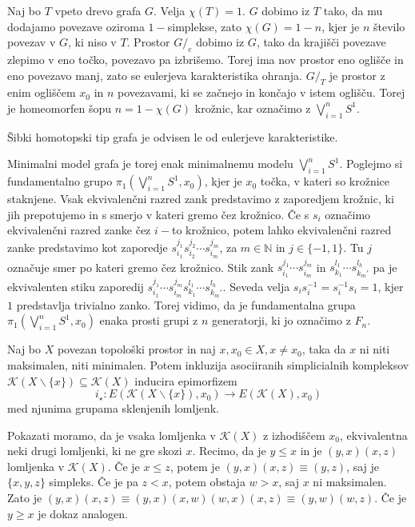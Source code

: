 \documentclass[mat1]{fmfdelo}
\newcommand{\N}{\mathbb N}
\begin{document}
Naj bo $T$ vpeto drevo grafa $G$. Velja $\chi(T)=1$. $G$ dobimo iz $T$ tako, da mu dodajamo povezave 
oziroma $1-$simplekse, zato $\chi(G)=1-n$, kjer je $n$ število povezav v $G$, ki niso v 
$T$. Prostor $G/_e$ dobimo iz $G$, tako da krajišči povezave zlepimo v eno točko, povezavo pa 
izbrišemo. Torej ima nov prostor eno oglišče in eno povezavo manj, zato se eulerjeva karakteristika 
ohranja. $G/_T$ je prostor z enim ogliščem $x_0$ in $n$ povezavami, ki se začnejo in končajo v istem 
oglišču. Torej je homeomorfen šopu $n=1-\chi(G)$ krožnic, kar označimo z $\bigvee\limits_{i=1}^{n}S^1$.

\begin{posledica}
    Šibki homotopski tip grafa je odvisen le od eulerjeve karakteristike.
    \label{pos:karakteristika}
\end{posledica}

Minimalni model grafa je torej enak minimalnemu modelu  $\bigvee\limits_{i=1}^{n}S^1$. Poglejmo si 
fundamentalno grupo  $\pi_1(\bigvee\limits_{i=1}^{n}S^1,x_0)$, kjer je $x_0$ točka, v kateri so krožnice 
staknjene. Vsak ekvivalenčni razred zank predstavimo z zaporedjem krožnic, ki jih prepotujemo in s 
smerjo v kateri gremo čez krožnico. Če s $s_i$ označimo ekvivalenčni razred zanke čez $i-$to krožnico, potem lahko ekvivalenčni razred
zanke  predstavimo kot zaporedje $s_{i_1}^{j_1}s_{i_2}^{j_2}\cdots s_{i_m}^{j_m}$, za $m\in \N$ in 
$j\in \{-1,1\}.$ Tu $j$ označuje smer po kateri gremo čez krožnico. Stik zank 
$s_{i_1}^{j_1}\cdots s_{i_m}^{j_m}$ in $s_{k_1}^{l_1}\cdots s_{k_m'}^{l_h}$ pa je ekvivalenten 
stiku zaporedij $s_{i_1}^{j_1}\cdots s_{i_m}^{j_m}s_{k_1}^{l_1}\cdots s_{k_m'}^{l_h}$.
Seveda velja $s_i s_i^{-1}=s_i^{-1}s_i=1$, kjer $1$ predstavlja trivialno zanko. 
Torej vidimo, da je fundamentalna grupa $\pi_1(\bigvee\limits_{i=1}^{n}S^1,x_0)$ enaka prosti grupi z $n$
generatorji, ki jo označimo z $F_n$.

\begin{trditev}
    Naj bo $X$ povezan topološki prostor in naj $x,x_0\in X, x\neq x_0$, taka da $x$ ni niti maksimalen, niti minimalen. Potem inkluzija asociiranih simplicialnih kompleksov $\mathcal{K}(X\backslash\{x\})\subseteq \mathcal{K}(X)$ inducira epimorfizem 
    $$
i_\star\colon E(\mathcal{K}(X\backslash\{x\}),x_0)\rightarrow E(\mathcal{K}(X),x_0)
    $$
    med njunima grupama sklenjenih lomljenk.
\end{trditev}

\begin{dokaz}
    Pokazati moramo, da je vsaka lomljenka v $\mathcal{K}(X)$ z izhodiščem $x_0$, ekvivalentna neki drugi lomljenki, ki ne gre skozi $x$.
    Recimo, da je $y\leq x$ in je $(y,x)(x,z)$ lomljenka v $\mathcal{K}(X)$. Če je $x\leq z$, potem je $(y,x)(x,z)\equiv(y,z)$, saj je $\{x,y,z\}$ simpleks. Če je pa $z< x$, potem obstaja $w>x$, saj $x$ ni maksimalen. Zato je $(y,x)(x,z)\equiv(y,x)(x,w)(w,x)(x,z)\equiv (y,w)(w,z)$. Če je $y\geq x$ je dokaz analogen.
\end{dokaz}
\end{document}
